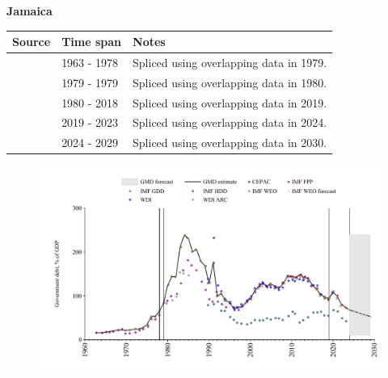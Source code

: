 \documentclass[12pt,a4paper,landscape]{article}
\begin{document}
\begin{adjustbox}{max totalsize={\paperwidth}{\paperheight},center}
\begin{minipage}[t][\textheight][t]{\textwidth}
\vspace*{0.5cm}
{}
\begin{center}
{\Large\bfseries Jamaica}
\end{center}
\vspace{0.5cm}
\begin{table}[H]
\centering
\small
\begin{tabular}{|l|l|l|}
\hline
\textbf{Source} & \textbf{Time span} & \textbf{Notes} \\
\hline
\rowcolor{white}\cite{IMF_GDD}& 1963 - 1978 &Spliced using overlapping data in 1979.\\
\rowcolor{lightgray}\cite{IMF_HDD}& 1979 - 1979 &Spliced using overlapping data in 1980.\\
\rowcolor{white}\cite{IMF_GDD}& 1980 - 2018 &Spliced using overlapping data in 2019.\\
\rowcolor{lightgray}\cite{IMF_FPP}& 2019 - 2023 &Spliced using overlapping data in 2024.\\
\rowcolor{white}\cite{IMF_WEO_forecast}& 2024 - 2029 &Spliced using overlapping data in 2030.\\
\hline
\end{tabular}
\end{table}
\begin{figure}[H]
\centering
\includegraphics[width=\textwidth,height=0.6\textheight,keepaspectratio]{graphs/JAM_govdebt_GDP.pdf}
\end{figure}
\end{minipage}
\end{adjustbox}
\end{document}
